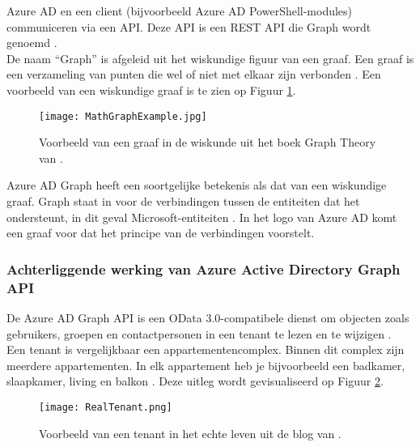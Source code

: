 Azure \ac{AD} en een client (bijvoorbeeld Azure \ac{AD} PowerShell-modules) communiceren via een \ac{API}. Deze \ac{API} is een \ac{REST} \ac{API} die Graph wordt genoemd \autocite{Microsoft2015}. \\ 

De naam “Graph” is afgeleid uit het wiskundige figuur van een graaf. Een graaf is een verzameling van punten die wel of niet met elkaar zijn verbonden \autocite{Denaux2022}. Een voorbeeld van een wiskundige graaf is te zien op Figuur \ref{mga}. \\

\begin{figure}[h!]
    \texttt{[image: MathGraphExample.jpg]}
    \caption[Voorbeeld wiskundige graaf]{Voorbeeld van een graaf in de wiskunde uit het boek Graph Theory van \textcite{Diestel2010}.}
    \label{mga}
\end{figure}

Azure \ac{AD} Graph heeft een soortgelijke betekenis als dat van een wiskundige graaf. Graph staat in voor de verbindingen tussen de entiteiten dat het ondersteunt, in dit geval Microsoft-entiteiten \autocite{Kokkarinen2022}. In het logo van \textcite{Microsoftb} Azure \ac{AD} komt een graaf voor dat het principe van de verbindingen voorstelt. \\


\subsubsection{Achterliggende werking van Azure Active Directory Graph API}


De Azure \ac{AD} Graph \ac{API} is een OData 3.0-compatibele dienst om objecten zoals gebruikers, groepen en contactpersonen in een tenant te lezen en te wijzigen \autocite{Microsoft2016}. \\

Een tenant is vergelijkbaar een appartementencomplex. Binnen dit complex zijn meerdere appartementen. In elk appartement heb je bijvoorbeeld een badkamer, slaapkamer, living en balkon \autocite{Saxton2015}. Deze uitleg wordt gevisualiseerd op Figuur \ref{rlt}. \\

\begin{figure}[!h]
    \texttt{[image: RealTenant.png]}
    \caption[Voorbeeld werkelijke tenant]{Voorbeeld van een tenant in het echte leven uit de blog van \textcite{Saxton2015}.}
    \label{rlt}
\end{figure}

